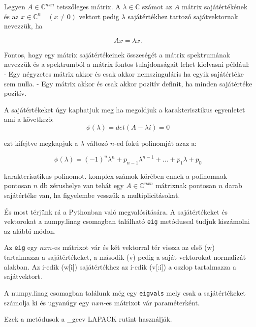 Legyen \(A \in \mathbb{C}^{nxn}\) tetszőleges mátrix. A
\(\lambda \in \mathbb{C}\) számot az \(A\) mátrix sajátértékének és az
\(x \in \mathbb{C}^n \quad (x\neq0)\) vektort pedig \(\lambda\)
sajátértékhez tartozó sajátvektornak nevezzük, ha

\[
Ax=\lambda x.
\]

    Fontos, hogy egy mátrix sajátértékeinek összeségét a mátrix spektrumának
nevezzük és a spektrumból a mátrix fontos tulajdonságait lehet kiolvasni
például: - Egy négyzetes mátrix akkor és csak akkor nemszinguláris ha
egyik sajátértéke sem nulla. - Egy mátrix akkor és csak akkor pozitív
definit, ha minden sajátértéke pozitív.

    A sajátértékeket úgy kaphatjuk meg ha megoldjuk a karakterisztikus
egyenletet ami a következő: \[
\phi(\lambda)=det(A-\lambda i)=0
\]

ezt kifejtve megkapjuk a \(\lambda\) változó \(n\)-ed fokú polinomját
azaz a:

\[
\phi(\lambda)=(-1)^n\lambda^n+p_{n-1}\lambda^{n-1}+\dots+p_1\lambda+p_0
\]

karakterisztikus polinomot. komplex számok körében ennek a polinomnak
pontosan \(n\) db zérushelye van tehát egy \(A\in \mathbb{C}^{nxn}\)
mátrixnak pontosan \(n\) darab sajátértéke van, ha figyelembe vesszük a
multiplicitásokat.

    És most térjünk rá a Pythonban való megvalósítására. A sajátértékeket és
vektorokat a numpy.linag csomagban található \texttt{eig} metódussal
tudjuk kiszámolni az alábbi módon.

\begin{python}

\end{python}

    Az \texttt{eig} egy \(nxn\)-es mátrixot vár és két vektorral tér vissza
az első (w) tartalmazza a sajátértékeket, a második (v) pedig a saját
vektorokat normalizát alakban. Az i-edik (w{[}i{]}) sajátértékhez az
i-edik (v{[}:i{]}) a oszlop tartalmazza a sajátvektort.

    A numpy.linag csomagban találunk még egy \texttt{eigvals} mely csak a
sajátértékeket számolja ki és ugyanúgy egy \(nxn\)-es mátrixot vár
paraméterként.

\begin{python}

\end{python}

    Ezek a metódusok a \_geev LAPACK rutint használják.


